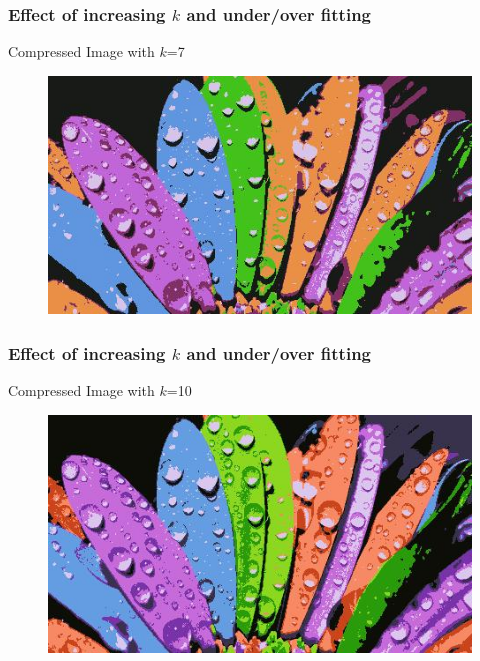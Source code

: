 \documentclass{beamer}
\begin{document}
\begin{frame}
\frametitle{Effect of increasing $k$ and under/over fitting}
\begin{center}
Compressed Image with $k$=7
\end{center}
\begin{figure}
\includegraphics[scale=0.7]{flower_compressed_7.jpg}
\end{figure}
\end{frame}

\begin{frame}
\frametitle{Effect of increasing $k$ and under/over fitting}
\begin{center}
Compressed Image with $k$=10
\end{center}
\begin{figure}
\includegraphics[scale=0.7]{flower_compressed_10.jpg}
\end{figure}
\end{frame}
\end{document}
